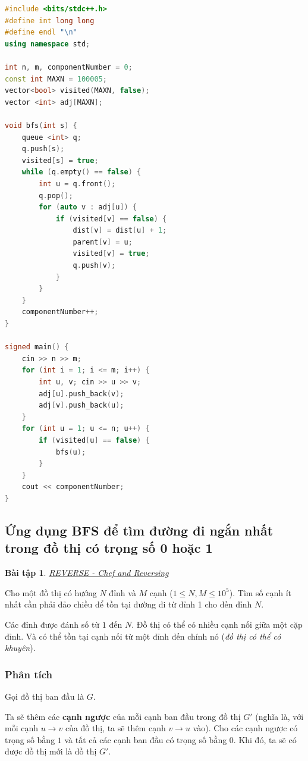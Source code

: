 \documentclass{article}
\newtheorem{baitap}{Bài tập}
\begin{document}
\begin{lstlisting}[language=C++, caption={Cài đặt, độ phức tạp $O(M + N)$}]
#include <bits/stdc++.h>
#define int long long
#define endl "\n"
using namespace std;

int n, m, componentNumber = 0; 
const int MAXN = 100005;
vector<bool> visited(MAXN, false);
vector <int> adj[MAXN];

void bfs(int s) { 
    queue <int> q;
    q.push(s);
    visited[s] = true;
    while (q.empty() == false) {
        int u = q.front();
        q.pop();
        for (auto v : adj[u]) {
            if (visited[v] == false) {
                dist[v] = dist[u] + 1;
                parent[v] = u;
                visited[v] = true;
                q.push(v);
            }
        }
    }
    componentNumber++;
}

signed main() {
    cin >> n >> m;
    for (int i = 1; i <= m; i++) {
        int u, v; cin >> u >> v;
        adj[u].push_back(v);
        adj[v].push_back(u);
    }
    for (int u = 1; u <= n; u++) {
        if (visited[u] == false) {
            bfs(u);
        }
    }
    cout << componentNumber;
}
\end{lstlisting}

\subsection{Ứng dụng BFS để tìm đường đi ngắn nhất trong đồ thị có trọng số 0 hoặc 1}

\begin{baitap}
    \href{https://site.ada.edu.az/~medv/acm/Docs%20Codechef/2014/August%20Challenge%202014/reverse.htm}{REVERSE - Chef and Reversing}
\end{baitap}

Cho một đồ thị có hướng $N$ đỉnh và $M$ cạnh ($1 \leq N, M \leq 10^5$). Tìm số cạnh ít nhất cần phải đảo chiều để tồn tại đường đi từ đỉnh 1 cho đến đỉnh $N$.

Các đỉnh được đánh số từ $1$ đến $N$. Đồ thị có thể có nhiều cạnh nối giữa một cặp đỉnh. Và có thể tồn tại cạnh nối từ một đỉnh đến chính nó (\textit{đồ thị có thể có khuyên}).

\subsubsection{Phân tích}

Gọi đồ thị ban đầu là $G$.

Ta sẽ thêm các \textbf{cạnh ngược} của mỗi cạnh ban đầu trong đồ thị $G'$ (nghĩa là, với mỗi cạnh $u \to v$ của đồ thị, ta sẽ thêm cạnh $v \to u$ vào).  
Cho các cạnh ngược có trọng số bằng $1$ và tất cả các cạnh ban đầu có trọng số bằng $0$. Khi đó, ta sẽ có được đồ thị mới là đồ thị $G'$.
\end{document}
